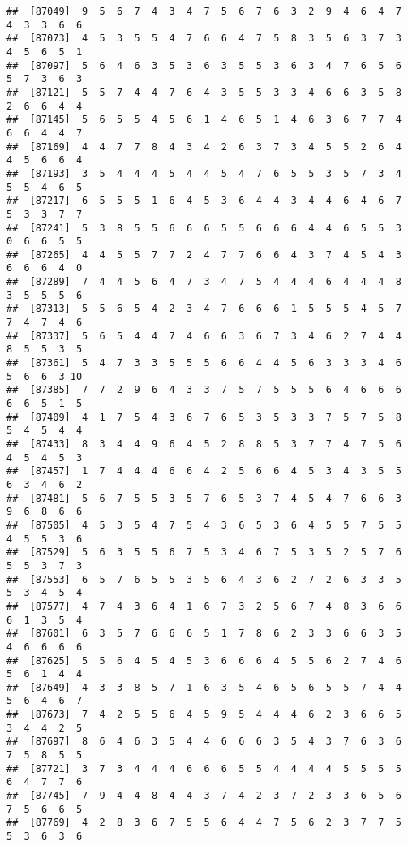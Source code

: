 \documentclass[
]{book}
\begin{document}
\begin{verbatim}
##  [87049]  9  5  6  7  4  3  4  7  5  6  7  6  3  2  9  4  6  4  7  4  3  3  6  6
##  [87073]  4  5  3  5  5  4  7  6  6  4  7  5  8  3  5  6  3  7  3  4  5  6  5  1
##  [87097]  5  6  4  6  3  5  3  6  3  5  5  3  6  3  4  7  6  5  6  5  7  3  6  3
##  [87121]  5  5  7  4  4  7  6  4  3  5  5  3  3  4  6  6  3  5  8  2  6  6  4  4
##  [87145]  5  6  5  5  4  5  6  1  4  6  5  1  4  6  3  6  7  7  4  6  6  4  4  7
##  [87169]  4  4  7  7  8  4  3  4  2  6  3  7  3  4  5  5  2  6  4  4  5  6  6  4
##  [87193]  3  5  4  4  4  5  4  4  5  4  7  6  5  5  3  5  7  3  4  5  5  4  6  5
##  [87217]  6  5  5  5  1  6  4  5  3  6  4  4  3  4  4  6  4  6  7  5  3  3  7  7
##  [87241]  5  3  8  5  5  6  6  6  5  5  6  6  6  4  4  6  5  5  3  0  6  6  5  5
##  [87265]  4  4  5  5  7  7  2  4  7  7  6  6  4  3  7  4  5  4  3  6  6  6  4  0
##  [87289]  7  4  4  5  6  4  7  3  4  7  5  4  4  4  6  4  4  4  8  3  5  5  5  6
##  [87313]  5  5  6  5  4  2  3  4  7  6  6  6  1  5  5  5  4  5  7  7  4  7  4  6
##  [87337]  5  6  5  4  4  7  4  6  6  3  6  7  3  4  6  2  7  4  4  8  5  5  3  5
##  [87361]  5  4  7  3  3  5  5  5  6  6  4  4  5  6  3  3  3  4  6  5  6  6  3 10
##  [87385]  7  7  2  9  6  4  3  3  7  5  7  5  5  5  6  4  6  6  6  6  6  5  1  5
##  [87409]  4  1  7  5  4  3  6  7  6  5  3  5  3  3  7  5  7  5  8  5  4  5  4  4
##  [87433]  8  3  4  4  9  6  4  5  2  8  8  5  3  7  7  4  7  5  6  4  5  4  5  3
##  [87457]  1  7  4  4  4  6  6  4  2  5  6  6  4  5  3  4  3  5  5  6  3  4  6  2
##  [87481]  5  6  7  5  5  3  5  7  6  5  3  7  4  5  4  7  6  6  3  9  6  8  6  6
##  [87505]  4  5  3  5  4  7  5  4  3  6  5  3  6  4  5  5  7  5  5  4  5  5  3  6
##  [87529]  5  6  3  5  5  6  7  5  3  4  6  7  5  3  5  2  5  7  6  5  5  3  7  3
##  [87553]  6  5  7  6  5  5  3  5  6  4  3  6  2  7  2  6  3  3  5  5  3  4  5  4
##  [87577]  4  7  4  3  6  4  1  6  7  3  2  5  6  7  4  8  3  6  6  6  1  3  5  4
##  [87601]  6  3  5  7  6  6  6  5  1  7  8  6  2  3  3  6  6  3  5  4  6  6  6  6
##  [87625]  5  5  6  4  5  4  5  3  6  6  6  4  5  5  6  2  7  4  6  5  6  1  4  4
##  [87649]  4  3  3  8  5  7  1  6  3  5  4  6  5  6  5  5  7  4  4  5  6  4  6  7
##  [87673]  7  4  2  5  5  6  4  5  9  5  4  4  4  6  2  3  6  6  5  3  4  4  2  5
##  [87697]  8  6  4  6  3  5  4  4  6  6  6  3  5  4  3  7  6  3  6  7  5  8  5  5
##  [87721]  3  7  3  4  4  4  6  6  6  5  5  4  4  4  4  5  5  5  5  6  4  7  7  6
##  [87745]  7  9  4  4  8  4  4  3  7  4  2  3  7  2  3  3  6  5  6  7  5  6  6  5
##  [87769]  4  2  8  3  6  7  5  5  6  4  4  7  5  6  2  3  7  7  5  5  3  6  3  6

\end{verbatim}
\end{document}

